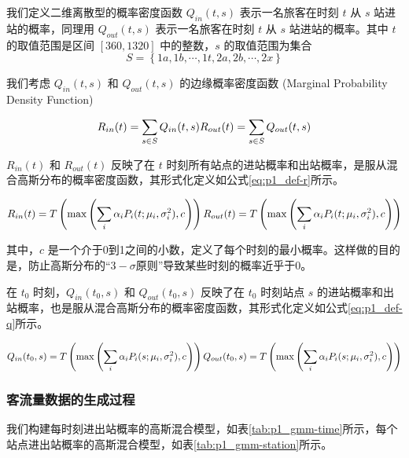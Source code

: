 \documentclass[12pt,a4paper]{mcmthesis}
\begin{document}
我们定义二维离散型的概率密度函数 $Q_{in}(t,s)$ 表示一名旅客在时刻 $t$ 从 $s$ 站进站的概率，同理用 $Q_{out}(t,s)$ 表示一名旅客在时刻 $t$ 从 $s$ 站进站的概率。其中 $t$ 的取值范围是区间 $[360,1320]$ 中的整数，$s$ 的取值范围为集合
\[ S = \left\{ 1a,1b,\cdots,1t,2a,2b,\cdots,2x \right\} \]

我们考虑 $Q_{in}(t,s)$ 和 $Q_{out}(t,s)$ 的边缘概率密度函数 (Marginal Probability Density Function)

\begin{equation*}
	R_{in}(t) = \sum_{s \in S} Q_{in}(t,s) \\
	R_{out}(t) = \sum_{s \in S} Q_{out}(t,s)
\end{equation*}

$R_{in}(t)$ 和 $R_{out}(t)$ 反映了在 $t$ 时刻所有站点的进站概率和出站概率，是服从混合高斯分布的概率密度函数，其形式化定义如公式\ref{eq:p1_def-r}所示。

\begin{equation}
	R_{in}(t) = T \left( \max \left( \sum_i \alpha_i P_i(t;\mu_i,\sigma^2_i), c \right) \right) \\
	R_{out}(t) = T \left( \max \left( \sum_i \alpha_i P_i(t;\mu_i,\sigma^2_i), c \right) \right)
	\label{eq:p1_def-r}
\end{equation}

其中，$c$ 是一个介于0到1之间的小数，定义了每个时刻的最小概率。这样做的目的是，防止高斯分布的“$3-\sigma$原则”导致某些时刻的概率近乎于0。

在 $t_0$ 时刻，$Q_{in}(t_0,s)$ 和 $Q_{out}(t_0,s)$ 反映了在 $t_0$ 时刻站点 $s$ 的进站概率和出站概率，也是服从混合高斯分布的概率密度函数，其形式化定义如公式\ref{eq:p1_def-q}所示。

\begin{equation}
	Q_{in}(t_0,s) = T \left( \max \left( \sum_i \alpha_i P_i(s;\mu_i,\sigma^2_i), c \right) \right) \\
	Q_{out}(t_0,s) = T \left( \max \left( \sum_i \alpha_i P_i(s;\mu_i,\sigma^2_i), c \right) \right)
	\label{eq:p1_def-q}
\end{equation}

    \subsubsection{客流量数据的生成过程}

        我们构建每时刻进出站概率的高斯混合模型，如表\ref{tab:p1_gmm-time}所示，每个站点进出站概率的高斯混合模型，如表\ref{tab:p1_gmm-station}所示。
\end{document}
